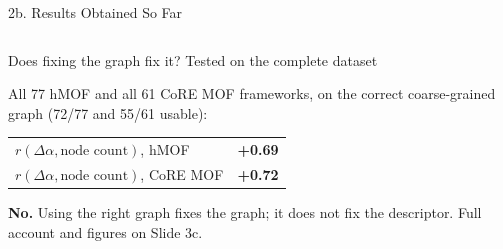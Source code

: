 \documentclass[aspectratio=169, 11pt]{beamer}
\begin{document}
\begin{frame}{2b. Results Obtained So Far}
\begin{columns}[T]
\begin{alertblock}{\footnotesize Does fixing the graph fix it? Tested on the complete dataset}
{\scriptsize
All 77 hMOF and all 61 CoRE MOF frameworks, on the correct coarse-grained graph (72/77 and
55/61 usable):
\begin{tabular}{@{}lc@{}}
$r(\Delta\alpha,\text{node count})$, hMOF & \textbf{+0.69} \\
$r(\Delta\alpha,\text{node count})$, CoRE MOF & \textbf{+0.72} \\
\end{tabular}
\vspace{0.08cm}

\textbf{No.} Using the right graph fixes the graph; it does not fix the descriptor. Full
account and figures on Slide 3c.}
\end{alertblock}
\end{columns}
\end{frame}

\end{document}
